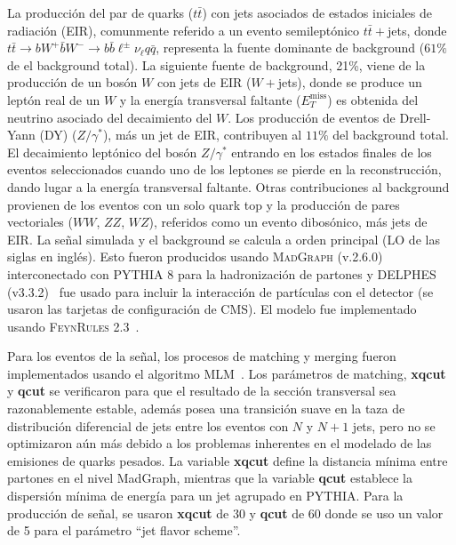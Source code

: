 La producción del par de quarks ($t\bar{t}$) con jets asociados de estados iniciales de radiación (EIR), comunmente referido a un evento semileptónico $t\bar{t}+$jets, donde $t\bar{t} \to b W^+ \bar{b}W^- \to b\bar{b}\ell^{\pm}\nu_{\ell}q\bar{q}$, representa la fuente dominante de background ($61\%$ de el background total). La siguiente fuente de background, 21\%, viene de la producción de un bosón $W$ con jets de EIR ($W+$jets), donde se produce un leptón real de un $W$ y la energía transversal faltante ($E^{\text{miss}}_T$) es obtenida del neutrino asociado del decaimiento del $W$. Los producción de eventos de Drell-Yann (DY) ($Z/\gamma^*$), más un jet de EIR, contribuyen al $11\%$ del background total. El decaimiento leptónico del bosón $Z/\gamma^*$ entrando en los estados finales de los eventos seleccionados cuando uno de los leptones se pierde en la reconstrucción, dando lugar a la energía transversal faltante. Otras contribuciones al background provienen de los eventos con un solo quark top y la producción de pares vectoriales ($WW$, $ZZ$, $WZ$), referidos como un evento dibosónico, más jets de EIR. La señal simulada y el background se calcula a orden principal (LO de las siglas en inglés). Esto fueron producidos usando \textsc{MadGraph} (v.2.6.0)~\cite{Alwall:2014hca} interconectado con \textsc{PYTHIA 8} \cite{Sjostrand:2014zea} para la hadronización de partones y \textsc{DELPHES} (v3.3.2)~\cite{deFavereau:2013fsa} fue usado para incluir la interacción de partículas con el detector (se usaron las tarjetas de configuración de CMS). El modelo fue implementado usando \textsc{FeynRules 2.3}~\cite{Christensen:2008py,Degrande:2011ua,Alloul:2013bka}.

Para los eventos de la señal, los procesos de matching y merging fueron implementados usando el algoritmo MLM~\cite{Alwall:2007fs}. Los parámetros de matching, \textbf{xqcut} y \textbf{qcut} se verificaron para que el resultado de la sección transversal sea razonablemente estable, además posea una transición suave en la taza de distribución diferencial de jets entre los eventos con $N$ y $N + 1$ jets, pero no se optimizaron aún más debido a los problemas inherentes en el modelado de las emisiones de quarks pesados. La variable \textbf{xqcut} define la distancia mínima entre partones en el nivel MadGraph, mientras que la variable \textbf{qcut} establece la dispersión mínima de energía para un jet agrupado en PYTHIA. Para la producción de señal, se usaron \textbf{xqcut} de $30$ y \textbf{qcut} de $60$ donde se uso un valor de 5 para el parámetro \textquotedblleft jet flavor scheme\textquotedblright.

